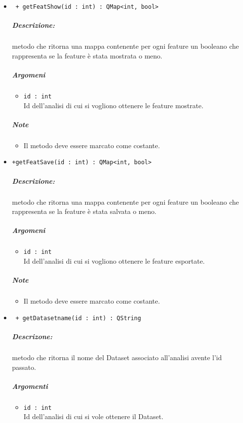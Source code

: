 \begin{itemize}
	\item \color{blue}\verb! + getFeatShow(id : int) : QMap<int, bool>!\\
	\color{black}
	\subparagraph{Descrizione:} metodo che ritorna una mappa contenente per ogni feature un booleano che rappresenta se la feature\g{} è stata mostrata o meno.
	\subparagraph{Argomeni}
		\begin{itemize}
			\item \color{RoyalPurple}\verb!id : int!\\
			\color{black}Id dell'analisi di cui si vogliono ottenere le feature\g{} mostrate.
		\end{itemize}
	\subparagraph{Note}
		\begin{itemize}
			\item Il metodo deve essere marcato come costante.
		\end{itemize}
		
	\item \color{blue}\verb!+getFeatSave(id : int) : QMap<int, bool>!\\
	\color{black}
	\subparagraph{Descrizione:} metodo che ritorna una mappa contenente per ogni feature\g{} un booleano che rappresenta se la feature\g{} è stata salvata o meno.
	\subparagraph{Argomeni}
		\begin{itemize}
			\item \color{RoyalPurple}\verb!id : int!\\
			\color{black}Id dell'analisi di cui si vogliono ottenere le feature\g{} esportate.
		\end{itemize}
	\subparagraph{Note}
		\begin{itemize}
			\item Il metodo deve essere marcato come costante.
		\end{itemize}
		
	\item \color{blue}\verb! + getDatasetname(id : int) : QString!\\
	\color{black}
	\subparagraph{Descrizone:} metodo che ritorna il nome del Dataset\g{} associato all'analisi avente l'id passato.
	\subparagraph{Argomenti}
		\begin{itemize}
			\item \color{RoyalPurple}\verb!id : int!\\
			\color{black}Id dell'analisi di cui si vole ottenere il Dataset\g{}.
		\end{itemize}


\end{itemize}

